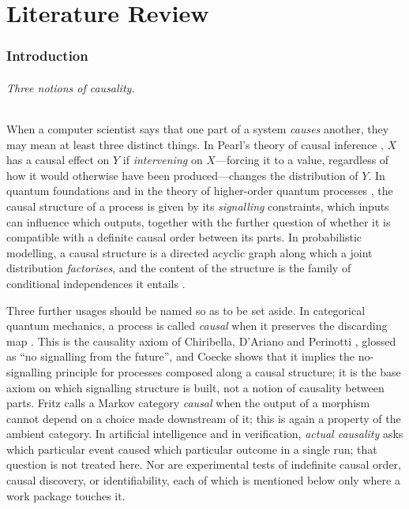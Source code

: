 \part{Literature Review}

\section{Introduction}\label{sec:intro}

\paragraph{Three notions of causality.}
When a computer scientist says that one part of a system \emph{causes} another, they may mean at least three distinct things. In Pearl's theory of causal inference \cite{pearl2009causality}, $X$ has a causal effect on $Y$ if \emph{intervening} on $X$---forcing it to a value, regardless of how it would otherwise have been produced---changes the distribution of $Y$. In quantum foundations and in the theory of higher-order quantum processes \cite{kissinger2019categorical,oreshkov2012noncausal}, the causal structure of a process is given by its \emph{signalling} constraints, which inputs can influence which outputs, together with the further question of whether it is compatible with a definite causal order between its parts. In probabilistic modelling, a causal structure is a directed acyclic graph along which a joint distribution \emph{factorises}, and the content of the structure is the family of conditional independences it entails \cite{pearl2009causality,fritz2023dseparation}.

Three further usages should be named so as to be set aside. In categorical quantum mechanics, a process is called \emph{causal} when it preserves the discarding map \cite{PQP_Coecke_Kissinger_2017}. This is the causality axiom of Chiribella, D'Ariano and Perinotti \cite{chiribella2010purification}, glossed as ``no signalling from the future'', and Coecke \cite{coecke2014terminality} shows that it implies the no-signalling principle for processes composed along a causal structure; it is the base axiom on which signalling structure is built, not a notion of causality between parts. Fritz \cite{fritz2020synthetic} calls a Markov category \emph{causal} when the output of a morphism cannot depend on a choice made downstream of it; this is again a property of the ambient category. In artificial intelligence and in verification, \emph{actual causality} \cite{halpern2016actual} asks which particular event caused which particular outcome in a single run; that question is not treated here. Nor are experimental tests of indefinite causal order, causal discovery, or identifiability, each of which is mentioned below only where a work package touches it.

